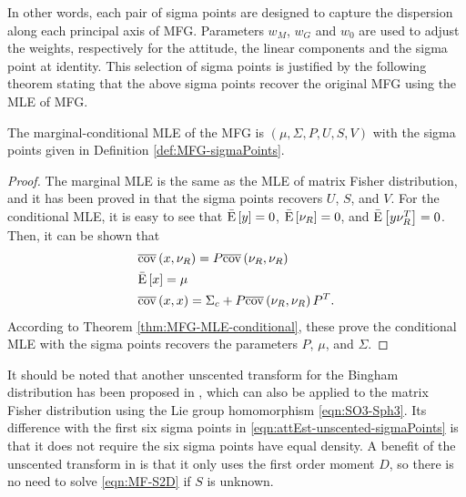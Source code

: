 In other words, each pair of sigma points are designed to capture the dispersion along each principal axis of MFG.
Parameters $w_M$, $w_G$ and $w_0$ are used to adjust the weights, respectively for the attitude, the linear components and the sigma point at identity.
This selection of sigma points is justified by the following theorem stating that the above sigma points recover the original MFG using the MLE of MFG.
\begin{theorem}
	The marginal-conditional MLE of the MFG is $(\mu,\Sigma,P,U,S,V)$ with the sigma points given in Definition \ref{def:MFG-sigmaPoints}.
\end{theorem}
\begin{proof}
	The marginal MLE is the same as the MLE of matrix Fisher distribution, and it has been proved in \cite[Theorem IV.1]{lee2018bayesian} that the sigma points recovers $U$, $S$, and $V$.
	For the conditional MLE, it is easy to see that $\bar{\mathrm{E}}\left[ y \right]=0$, $\bar{\mathrm{E}}\left[ \nu_R \right]=0$, and $\bar{\mathrm{E}}\left[ y\nu_R^T \right]=0$.
	Then, it can be shown that
	\begin{align*}
		&\overline{\mathrm{cov}}\left( x, \nu_R \right) = P\overline{\mathrm{cov}}\left( \nu_R, \nu_R \right) \\
		&\bar{\mathrm{E}}\left[ x \right] = \mu \\
		&\overline{\mathrm{cov}}\left( x, x \right) = \Sigma_c + P\overline{\mathrm{cov}}\left( \nu_R, \nu_R \right)P^T.
	\end{align*}
	According to Theorem \ref{thm:MFG-MLE-conditional}, these prove the conditional MLE with the sigma points recovers the parameters $P$, $\mu$, and $\Sigma$.
\end{proof}

It should be noted that another unscented transform for the Bingham distribution has been proposed in \cite{gilitschenski2015unscented}, which can also be applied to the matrix Fisher distribution using the Lie group homomorphism \eqref{eqn:SO3-Sph3}.
Its difference with the first six sigma points in \eqref{eqn:attEst-unscented-sigmaPoints} is that it does not require the six sigma points have equal density.
A benefit of the unscented transform in \cite{gilitschenski2015unscented} is that it only uses the first order moment $D$, so there is no need to solve \eqref{eqn:MF-S2D} if $S$ is unknown.

